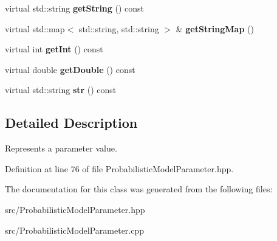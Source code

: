 \begin{DoxyCompactItemize}
virtual std\+::string {\bfseries get\+String} () const
\item 
\mbox{\label{classtops_1_1ProbabilisticModelParameterValue_a4fa0b0111c9d0f33f94383aeb77766bf}} 
virtual std\+::map$<$ std\+::string, std\+::string $>$ \& {\bfseries get\+String\+Map} ()
\item 
\mbox{\label{classtops_1_1ProbabilisticModelParameterValue_a46d19ee87d832264589d5fec597e7c35}} 
virtual int {\bfseries get\+Int} () const
\item 
\mbox{\label{classtops_1_1ProbabilisticModelParameterValue_a95ce476c632879bb00fb461a16091679}} 
virtual double {\bfseries get\+Double} () const
\item 
\mbox{\label{classtops_1_1ProbabilisticModelParameterValue_a15cfb09dd2319504c0d28303b76d0f91}} 
virtual std\+::string {\bfseries str} () const
\end{DoxyCompactItemize}


\subsection{Detailed Description}
Represents a parameter value. 

Definition at line 76 of file Probabilistic\+Model\+Parameter.\+hpp.



The documentation for this class was generated from the following files\+:\begin{DoxyCompactItemize}
\item 
src/Probabilistic\+Model\+Parameter.\+hpp\item 
src/Probabilistic\+Model\+Parameter.\+cpp\end{DoxyCompactItemize}
